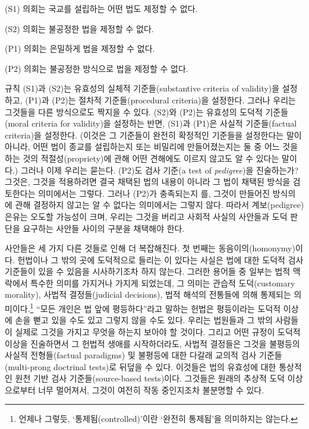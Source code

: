 (S1) 의회는 국교를 설립하는 어떤 법도 제정할 수 없다.

(S2) 의회는 불공정한 법을 제정할 수 없다.

(P1) 의회는 은밀하게 법을 제정할 수 없다.

(P2) 의회는 불공정한 방식으로 법을 제정할 수 없다.

규칙 (S1)과 (S2)는 유효성의 실체적 기준들(substantive criteria of
validity)을 설정하고, (P1)과 (P2)는 절차적 기준들(procedural criteria)을
설정한다. 그러나 우리는 그것들을 다른 방식으로도 짝지을 수 있다. (S2)와
(P2)는 유효성의 도덕적 기준들(moral criteria for validity)을 설정하는
반면, (S1)과 (P1)은 사실적 기준들(factual criteria)을 설정한다. (이것은
그 기준들이 완전히 확정적인 기준들을 설정한다는 말이 아니라, 어떤 법이
종교를 설립하는지 또는 비밀리에 만들어졌는지는 둘 중 어느 것을 하는 것의
적절성(propriety)에 관해 어떤 견해에도 이르지 않고도 알 수 있다는
말이다.) 그러나 이제 우리는 묻는다. (P2)도  검사 기준(a test
of \emph{pedigree})을 진술하는가? 그것은, 그것을 적용하려면 결국 채택된
법의 내용이 아니라 그 법이 채택된 방식을 검토한다는 의미에서는 그렇다.
그러나 (P2)가 충족되는지 를, 그것이 만들어진 방식의
에 관해 결정하지 않고는 알 수
없다는 의미에서는 그렇지 않다. 따라서 계보(pedigree) 은유는 오도할
가능성이 크며, 우리는 그것을 버리고 사회적 사실의 사안들과 도덕 판단을
요구하는 사안들 사이의 구분을 채택해야 한다.

사안들은 세 가지 다른 것들로 인해 더 복잡해진다. 첫 번째는
동음이의(homonymy)이다. 헌법이나 그 밖의 곳에 도덕적으로 들리는
이 있다는 사실은 법에 대한 도덕적 검사 기준들이 있을
수 있음을 시사하기조차 하지 않는다. 그러한 용어들 중 일부는 법적
맥락에서 특수한 의미를 가지거나 가지게 되었는데, 그 의미는 관습적
도덕(customary morality), 사법적 결정들(judicial decisions), 법적 해석의
전통들에 의해 통제되는 의미이다.\footnote{언제나 그렇듯,
  ‘통제됨(controlled)’이란 ‘완전히 통제됨’을 의미하지는 않는다.} “모든
개인은 법 앞에 평등하다”라고 말하는 헌법은 평등이라는 도덕적 이상에
손을 뻗고 있을 수도 있고 그렇지 않을 수도 있다. 우리는 법원들과 그 밖의
사람들이 실제로 그것을 가지고 무엇을 하는지 보아야 할 것이다. 그리고
어떤 규정이 도덕적 이상을 진술하면서 그 헌법적 생애를 시작하더라도,
사법적 결정들은 그것을 불평등의 사실적 전형들(factual paradigms) 및
불평등에 대한 다갈래 교의적 검사 기준들(multi-prong doctrinal tests)로
뒤덮을 수 있다. 이것들은 법의 유효성에 대한 통상적인 원천 기반 검사
기준들(source-based tests)이다. 그것들은 원래의 추상적 도덕 이상으로부터
너무 멀어져서, 그것이 여전히 작동 중인지조차 불분명할 수 있다.

